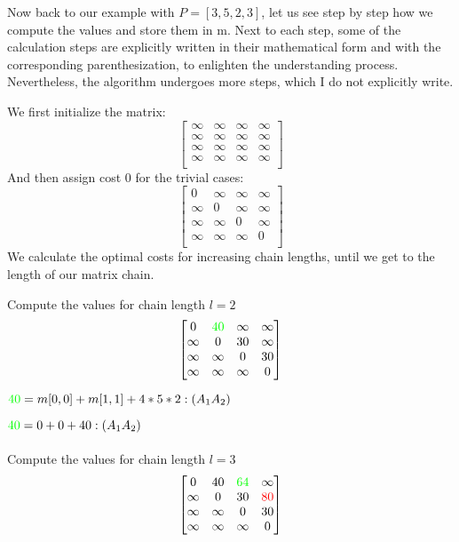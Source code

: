 Now back to our example with $P = [3, 5, 2, 3]$, let us see step by step how we compute the values and store them in m. Next to each step, 
some  of the calculation steps are explicitly written in their mathematical form and with the corresponding parenthesization, to enlighten the understanding process. Nevertheless, the algorithm
undergoes more steps, which I do not explicitly write.

We first initialize the matrix:
  \[
    \begin{bmatrix}
      \infty & \infty & \infty & \infty \\
      \infty & \infty & \infty & \infty \\
      \infty & \infty & \infty & \infty \\
      \infty & \infty & \infty & \infty \\
    \end{bmatrix}
  \]
And then assign cost 0 for the trivial cases: 
  \[
    \begin{bmatrix}
      0 & \infty & \infty & \infty \\
      \infty & 0 & \infty & \infty \\
      \infty & \infty & 0 & \infty \\
      \infty & \infty & \infty & 0 \\
    \end{bmatrix}
  \]
We calculate the optimal costs for increasing chain lengths, until we get to the length of our matrix chain.

Compute the values for chain length $l = 2$
  \[
    \begin{bmatrix}
      0 &  \textcolor{green}{40} & \infty & \infty \\
      \infty & 0 &  30  & \infty \\
      \infty & \infty & 0 & 30 \\
      \infty & \infty & \infty & 0 \\
    \end{bmatrix}
  \]

$\textcolor{green}{40} = m[0,0] + m[1,1] + 4*5*2 : (A_{1}A_{2})$

$\textcolor{green}{40} = 0 + 0  + 40 : (A_{1}A_{2})$
\\
\\
Compute the values for chain length $l = 3$
  \[
    \begin{bmatrix}
      0 & 40 & \textcolor{green}{64} & \infty \\
      \infty & 0 & 30  & \textcolor{red}{80} \\
      \infty & \infty & 0 & 30 \\
      \infty & \infty & \infty & 0 \\
    \end{bmatrix}
  \]
  
